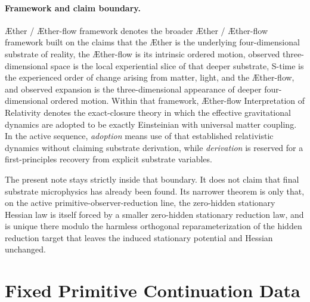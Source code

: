 \documentclass[11pt]{article}
\newcommand{\Aether}{\AE{}ther}
\newcommand{\Aflow}{\AE{}ther-flow}
\newcommand{\TheoryName}{\Aflow{} Interpretation of Relativity}
\newcommand{\TheoryProgram}{\Aether{} / \Aflow{} framework}
\begin{document}
\paragraph{Framework and claim boundary.}
\TheoryProgram{} denotes the broader \Aether{} / \Aflow{} framework built on the claims that the \Aether{} is the underlying four-dimensional substrate of reality, the \Aflow{} is its intrinsic ordered motion, observed three-dimensional space is the local experiential slice of that deeper substrate, S-time is the experienced order of change arising from matter, light, and the \Aflow{}, and observed expansion is the three-dimensional appearance of deeper four-dimensional ordered motion. Within that framework, \TheoryName{} denotes the exact-closure theory in which the effective gravitational dynamics are adopted to be exactly Einsteinian with universal matter coupling. In the active sequence, \emph{adoption} means use of that established relativistic dynamics without claiming substrate derivation, while \emph{derivation} is reserved for a first-principles recovery from explicit substrate variables.

The present note stays strictly inside that boundary. It does not claim that final substrate microphysics has already been found. Its narrower theorem is only that, on the active primitive-observer-reduction line, the zero-hidden stationary Hessian law is itself forced by a smaller zero-hidden stationary reduction law, and is unique there modulo the harmless orthogonal reparameterization of the hidden reduction target that leaves the induced stationary potential and Hessian unchanged.

\section{Fixed Primitive Continuation Data}
\end{document}
